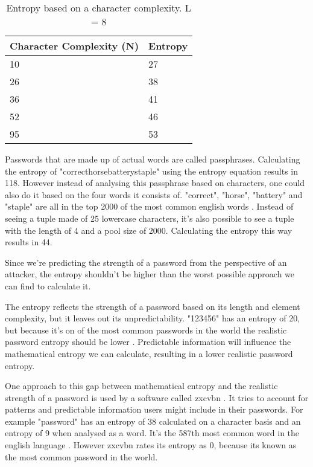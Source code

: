\begin{table}[h!]
\centering
\begin{tabular}{l l}
    Character Complexity (N) & Entropy \\
    \hline
    10                       & 27 \\
    26                       & 38 \\
    36                       & 41 \\
    52                       & 46 \\
    95                       & 53
\end{tabular}
\caption{Entropy based on a character complexity. L = 8}
\end{table}

Passwords that are made up of actual words are called passphrases. Calculating the entropy of "correcthorsebatterystaple" using the entropy equation results in 118. However instead of analysing this passphrase based on characters, one could also do it based on the four words it consists of. "correct", "horse", "battery" and "staple" are all in the top 2000 of the most common english words \cite{commonwords}. Instead of seeing a tuple made of 25 lowercase characters, it's also possible to see a tuple with the length of 4 and a pool size of 2000. Calculating the entropy this way results in 44. 

Since we're predicting the strength of a password from the perspective of an attacker, the entropy shouldn't be higher than the worst possible approach we can find to calculate it.

The entropy reflects the strength of a password based on its length and element complexity, but it leaves out its unpredictability. "123456" has an entropy of 20, but because it's on of the most common passwords in the world the realistic password entropy should be lower \cite{passwordquality}. Predictable information will influence the mathematical entropy we can calculate, resulting in a lower realistic password entropy.

One approach to this gap between mathematical entropy and the realistic strength of a password is used by a software called zxcvbn \cite{zxcvbn}. It tries to account for patterns and predictable information users might include in their passwords. For example "password" has an entropy of 38 calculated on a character basis and an entropy of 9 when analysed as a word. It's the 587th most common word in the english language \cite{commonwords}. However zxcvbn rates its entropy as 0, because its known as the most common password in the world.

\newpage